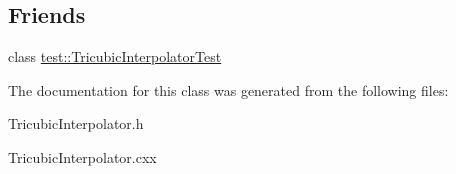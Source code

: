 \subsection*{Friends}
\begin{DoxyCompactItemize}
\item 
\hypertarget{class_tricubic_interpolator_a507b8c8173a81dd673312db5aa36c817}{
class \hyperlink{class_tricubic_interpolator_a507b8c8173a81dd673312db5aa36c817}{test::TricubicInterpolatorTest}}
\label{class_tricubic_interpolator_a507b8c8173a81dd673312db5aa36c817}

\end{DoxyCompactItemize}


The documentation for this class was generated from the following files:\begin{DoxyCompactItemize}
\item 
TricubicInterpolator.h\item 
TricubicInterpolator.cxx\end{DoxyCompactItemize}
